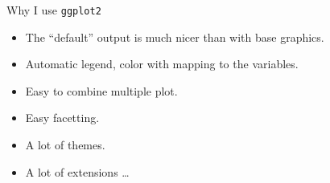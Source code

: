 \documentclass[14pt,ignorenonframetext,]{bredelebeamer}
\providecommand{\tightlist}{%
  \setlength{\itemsep}{0pt}\setlength{\parskip}{0pt}}
\begin{document}
\begin{frame}{Why I use \texttt{ggplot2}}

\Large

\begin{itemize}
\tightlist
\item
  The ``default'' output is much nicer than with base graphics.
\item
  Automatic legend, color with mapping to the variables.
\item
  Easy to combine multiple plot.
\item
  Easy facetting.
\item
  A lot of themes.
\item
  A lot of extensions \ldots{}
\end{itemize}

\end{frame}
\end{document}
